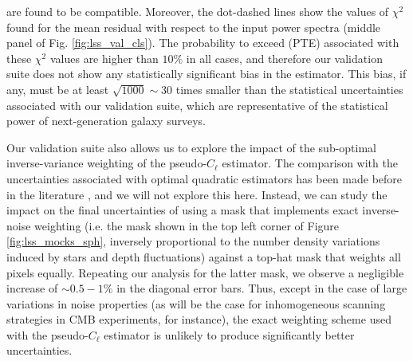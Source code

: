 \documentclass[usenatbib]{mnrasb}
\begin{document}
      are found to be compatible. Moreover, the dot-dashed lines show the values of $\chi^2$ found for the mean residual with respect to the input power spectra (middle panel of Fig. \ref{fig:lss_val_cls}). The probability to exceed (PTE) associated with these $\chi^2$ values are higher than $10\%$ in all cases, and therefore our validation suite does not show any statistically significant bias in the estimator. This bias, if any, must be at least $\sqrt{1000}\sim30$ times smaller than the statistical uncertainties associated with our validation suite, which are representative of the statistical power of next-generation galaxy surveys.
      
      Our validation suite also allows us to explore the impact of the sub-optimal inverse-variance weighting of the pseudo-$C_\ell$ estimator. The comparison with the uncertainties associated with optimal quadratic estimators has been made before in the literature \citep{2013MNRAS.435.1857L}, and we will not explore this here. Instead, we can study the impact on the final uncertainties of using a mask that implements exact inverse-noise weighting (i.e. the mask shown in the top left corner of Figure \ref{fig:lss_mocks_sph}, inversely proportional to the number density variations induced by stars and depth fluctuations) against a top-hat mask that weights all pixels equally. Repeating our analysis for the latter mask, we observe a negligible increase of $\sim0.5-1\%$ in the diagonal error bars. Thus, except in the case of large variations in noise properties (as will be the case for inhomogeneous scanning strategies in CMB experiments, for instance), the exact weighting scheme used with the pseudo-$C_\ell$ estimator is unlikely to produce significantly better uncertainties.
\end{document}
